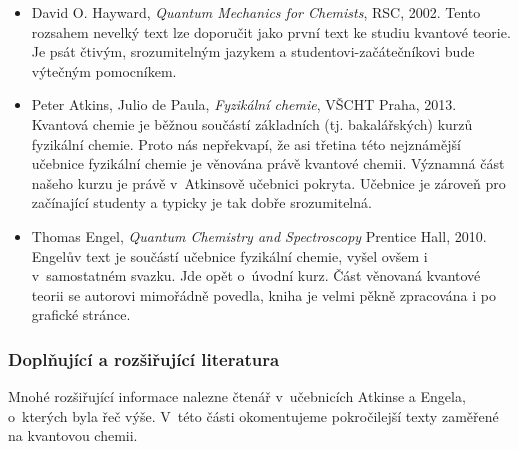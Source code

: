 \begin{itemize}

\item David O. Hayward, \textit{Quantum Mechanics for Chemists}, RSC, 2002. Tento rozsahem nevelký text lze doporučit jako první text ke studiu kvantové teorie. Je psát čtivým, srozumitelným jazykem a studentovi-začátečníkovi bude výtečným pomocníkem.   
\item Peter Atkins, Julio de Paula, \textit{Fyzikální chemie}, VŠCHT Praha, 2013. Kvantová chemie je běžnou součástí základních (tj. bakalářských) kurzů fyzikální chemie. Proto nás nepřekvapí, že asi třetina této nejznámější učebnice fyzikální chemie je věnována právě kvantové chemii. Významná část našeho kurzu je právě v~Atkinsově učebnici pokryta. Učebnice je zároveň pro začínající studenty a typicky je tak dobře srozumitelná.
\item Thomas Engel, \textit{Quantum Chemistry and Spectroscopy} Prentice Hall, 2010. Engelův text je součástí učebnice fyzikální chemie, vyšel ovšem i v~samostatném svazku. Jde opět o~úvodní kurz. Část věnovaná kvantové teorii se autorovi mimořádně povedla, kniha je velmi pěkně zpracována i po grafické stránce. 
\end{itemize}


\subsubsection{Doplňující a rozšiřující literatura}
Mnohé rozšiřující informace nalezne čtenář v~učebnicích Atkinse a Engela, o~kterých byla řeč výše. V~této části okomentujeme pokročilejší texty zaměřené na kvantovou chemii.
 
